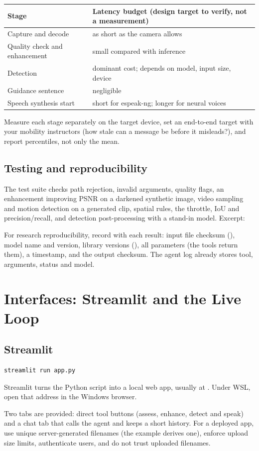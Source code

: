 \begin{table}[ht]\centering\small
\begin{tabular}{@{}lp{9cm}@{}}\toprule
\textbf{Stage} & \textbf{Latency budget (design target to verify, not a measurement)}\\\midrule
Capture and decode & as short as the camera allows\\
Quality check and enhancement & small compared with inference\\
Detection & dominant cost; depends on model, input size, device\\
Guidance sentence & negligible\\
Speech synthesis start & short for espeak-ng; longer for neural voices\\
\bottomrule\end{tabular}
\end{table}
Measure each stage separately on the target device, set an end-to-end target with your mobility instructors (how stale can a message be before it misleads?), and report percentiles, not only the mean.

\section{Testing and reproducibility}
The test suite checks path rejection, invalid arguments, quality flags, an enhancement improving PSNR on a darkened synthetic image, video sampling and motion detection on a generated clip, spatial rules, the throttle, IoU and precision/recall, and detection post-processing with a stand-in model. Excerpt:

For research reproducibility, record with each result: input file checksum (), model name and version, library versions (), all parameters (the tools return them), a timestamp, and the output checksum. The agent log already stores tool, arguments, status and model.

\chapter{Interfaces: Streamlit and the Live Loop}
\section{Streamlit}
\begin{lstlisting}[style=sh]
streamlit run app.py
\end{lstlisting}
Streamlit turns the Python script into a local web app, usually at . Under WSL, open that address in the Windows browser.

Two tabs are provided: direct tool buttons (assess, enhance, detect and speak) and a chat tab that calls the agent and keeps a short history. For a deployed app, use unique server-generated filenames (the example derives one), enforce upload size limits, authenticate users, and do not trust uploaded filenames.

